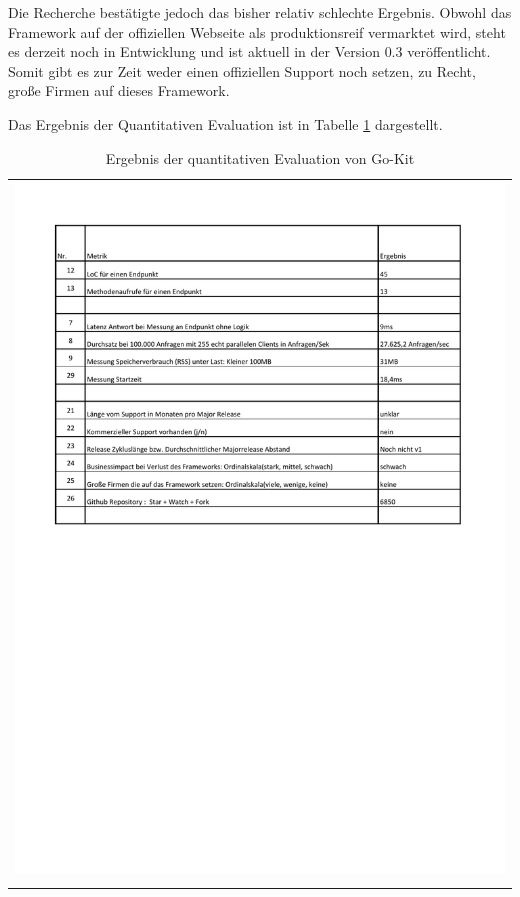 Die Recherche bestätigte jedoch das bisher relativ schlechte Ergebnis. Obwohl das Framework auf der offiziellen Webseite als produktionsreif vermarktet wird\cite{GoKitFAQ2017}, steht es derzeit noch in Entwicklung und ist aktuell in der Version $0.3$ veröffentlicht. Somit gibt es zur Zeit weder einen offiziellen Support noch setzen, zu Recht, große Firmen auf dieses Framework.

Das Ergebnis der Quantitativen Evaluation ist in Tabelle \ref{QuantErgebnisGokit} dargestellt.  

\begin{longtable}{c}
	\includegraphics[width=\linewidth]{Bilder/ObjekEvalErgebnisGokit.pdf} \\	
	\caption[Quantitative Evaluation Ergebnis Go-Kit]{Ergebnis der quantitativen Evaluation von Go-Kit}
	\label{QuantErgebnisGokit}\\
\end{longtable}
\FloatBarrier

